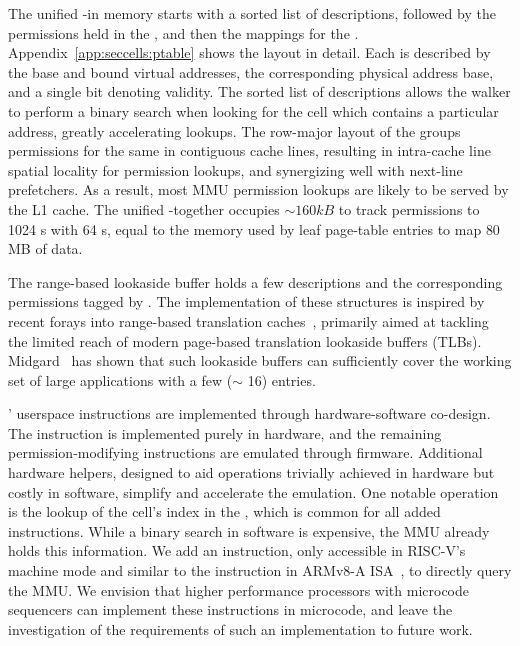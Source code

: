 The unified \ptable-\gtable in memory starts with a sorted
list of \cell descriptions, followed by the permissions held in the 
\ptable, and then the mappings for the \gtable.
Appendix~\ref{app:seccells:ptable} shows the layout in detail.
Each \cell is described by the base and bound virtual addresses, 
the corresponding physical address base, and a single bit denoting
validity.
The sorted list of \cell{} descriptions allows the \ptable walker to
perform a binary search when looking for the cell which contains a particular
address, greatly accelerating lookups.
The row-major layout of the \ptable groups permissions for the same \secdiv
in contiguous cache lines, resulting in intra-cache line spatial locality for
permission lookups, and synergizing well with next-line prefetchers.
As a result, most MMU permission lookups are likely to be served by the L1 cache.
The unified \ptable-\gtable together occupies $\sim160kB$ to track permissions
to 1024 \cell{}s with 64 \secdiv{}s, equal to the memory used by leaf 
page-table entries to map $80$MB of data.

The range-based lookaside buffer holds a few \cell{} descriptions
and the corresponding permissions tagged by \sid.
The implementation of these structures is inspired by recent forays into 
range-based translation caches~\cite{0003BOBFP21midgard, YanLNB19, BasuGCHS13}, 
primarily aimed at tackling the limited reach of modern page-based translation 
lookaside buffers (TLBs).
Midgard~\cite{0003BOBFP21midgard} has shown that such lookaside buffers can 
sufficiently cover the working set of large applications with a 
few ($\sim$ 16) entries.

\seccells' userspace instructions are implemented through 
hardware-software co-design.
The \sdswitch instruction is implemented purely in hardware, and the
remaining permission-modifying instructions are emulated through firmware.
Additional hardware helpers, designed to aid operations trivially achieved
in hardware but costly in software, simplify and accelerate the emulation.
One notable operation is the lookup of the cell's index in the 
\ptable, which is common for all added instructions.
While a binary search in software is expensive, the MMU already holds this
information. 
We add an instruction, only accessible in RISC-V's machine mode and similar 
to the  instruction in ARMv8-A ISA~\cite{ARMAT}, to directly query the MMU.
We envision that higher performance processors with microcode sequencers
can implement these instructions in microcode, and
leave the investigation of the requirements of such an implementation
to future work.

